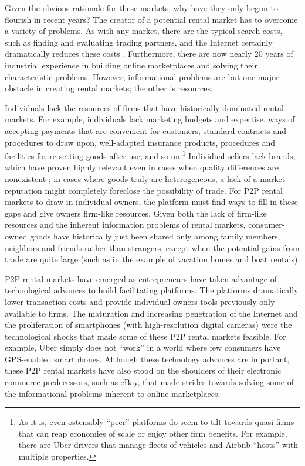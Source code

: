\documentclass[11pt]{article}
\begin{document}
Given the obvious rationale for these markets, why have they only begun to flourish in recent years? 
The creator of a potential rental market has to overcome a variety of problems. 
As with any market, there are the typical search costs, such as finding and evaluating trading partners, and the Internet certainly dramatically reduces these costs \citep{bakos1997reducing}.
Furthermore, there are now nearly 20 years of industrial experience in building online marketplaces and solving their characteristic problems. 
However, informational problems are but one major obstacle in creating rental markets; the other is resources. 


Individuals lack the resources of firms that have historically dominated rental markets. 
For example, individuals lack marketing budgets and expertise, ways of accepting payments that are convenient for customers, standard contracts and procedures to draw upon, well-adapted insurance products, procedures and facilities for re-setting goods after use, and so on.\footnote{
  As it is, even ostensibly ``peer'' platforms do seem to tilt towards quasi-firms that can reap economies of scale or enjoy other firm benefits.
  For example, there are Uber drivers that manage fleets of vehicles and Airbnb ``hosts'' with multiple properties. 
}
Individual sellers lack brands, which have proven highly relevant even in cases when quality differences are nonexistent \citep{bronnenberg2014pharmacists}; in cases where goods truly are heterogeneous, a lack of a market reputation might completely foreclose the possibility of trade.  
For P2P rental markets to draw in individual owners, the platform must find ways to fill in these gaps and give owners firm-like resources. 
Given both the lack of firm-like resources and the inherent information problems of rental markets, consumer-owned goods have historically just been shared only among family members, neighbors and friends rather than strangers, except when the potential gains from trade are quite large (such as in the example of vacation homes and boat rentals). 

P2P rental markets have emerged as entrepreneurs have taken advantage of technological advances to build facilitating platforms. 
The platforms dramatically lower transaction costs and provide individual owners tools previously only available to firms. 
The maturation and increasing penetration of the Internet and the proliferation of smartphones (with high-resolution digital cameras) were the technological shocks that made some of these P2P rental markets feasible.
For example, Uber simply does not ``work'' in a world where few consumers have GPS-enabled smartphones. 
Although these technology advances are important, these P2P rental markets have also stood on the shoulders of their electronic commerce predecessors, such as eBay, that made strides towards solving some of the informational problems inherent to online marketplaces. 
\end{document}
